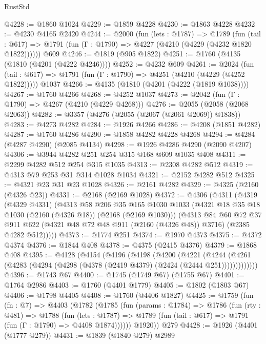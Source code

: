 \begin{lexlean}{RustStd}
\begin{coremodule}
@4228 := @1860 @1024
@4229 := @1859 @4228
@4230 := @1863 @4228
@4232 := @4230 @4165 @2420
@4244 := @2000
    (fun (lets : @1787) =>
    @1789
      (fun (tail : @617) => @1791 (fun (Γ : @1790) => @4227 (@4210 (@4229 (@4232 @1820 @1822))))))
    @609
@4246 := @1819 (@905 @1822)
@4251 := @1760 (@4135 (@1810 (@4201 (@4222 @4246))))
@4252 := @4232 @609
@4261 := @2024
    (fun (tail : @617) => @1791 (fun (Γ : @1790) => @4251 (@4210 (@4229 (@4252 @1822)))))
    @1037
@4266 := @4135 (@1810 (@4201 (@4222 (@1819 @1038))))
@4267 := @1760 @4266
@4268 := @4252 @1037
@4273 := @2042 (fun (Γ : @1790) => @4267 (@4210 (@4229 @4268)))
@4276 := @2055 (@2058 (@2068 @2063))
@4282 := @3357 (@4276 (@2055 (@2067 (@2061 @2069)) @1838))
@4283 := @4273 @4282
@4284 := @1926 @4266
@4286 := @4208 (@1851 @4282)
@4287 := @1760 @4286
@4290 := @1858 @4282 @4228 @4268
@4294 := @4284 (@4287 @4290) (@2085 @4134)
@4298 := @1926 @4286 @4290 (@2090 @4207)
@4306 := @3944 @4282 @251 @254 @315 @168 @609 @1035 @408
@4311 := @2299 @4282 @512 @254 @315 @1035
@4313 := @2308 @4282 @512
@4319 := @4313 @79 @253 @31 @314 @1028 @1034
@4321 := @2152 @4282 @512
@4325 := @4321 @23 @31 @23 @1028
@4326 := @2161 @4282
@4329 := @4325 (@2160 (@4326 @23))
@4331 := @2168 (@2169 @1028)
@4372 := @4306
    (@4311
      (@4319
        (@4329 @4331)
        (@4313
          @58
          @206
          @35
          @165
          @1030
          @1033
          (@4321 @18 @35 @18 @1030 (@2160 (@4326 @18)) (@2168 (@2169 @1030)))
          (@4313
            @84
            @60
            @72
            @37
            @911
            @622
            (@4321 @48 @72 @48 @911 (@2160 (@4326 @48)) @3716)
            (@2385 @4282 @512)))))
@4373 := @1774 @251
@4374 := @1970 @4373
@4375 := @4372 @4374
@4376 := @1844 @408
@4378 := @4375 (@2415 @4376)
@4379 := @1868 @408
@4395 := @4128
    (@4154
      (@4196
        (@4198
          (@4200
            (@4221
              (@4244
                (@4261 (@4283 (@4294 (@4298 (@4378 (@2419 @4379) (@2424 (@2444 @251)))))))))))))
@4396 := @1743 @67
@4400 := @1745 (@1749 @67) (@1755 @67)
@4401 := @1764 @2986
@4403 := @1760 (@4401 @1779)
@4405 := @1802 (@1803 @67)
@4406 := @1798 @4405
@4408 := @1760 (@4406 @1827)
@4425 := @1759
    (fun (fn : @7) =>
    @4403
      (@1782
        (@1785
          (fun (params : @1784) =>
          @1786
            (fun (rty : @481) =>
            @1788
              (fun (lets : @1787) =>
              @1789 (fun (tail : @617) => @1791 (fun (Γ : @1790) => @4408 @1874))))))
        @1920))
    @279
@4428 := @1926 (@4401 (@1777 @279))
@4431 := @1839 (@1840 @279) @2989

\end{coremodule}
\end{lexlean}
